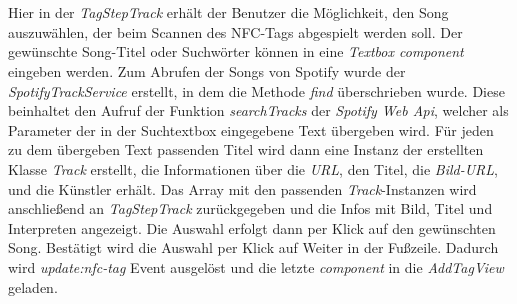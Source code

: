\documentclass[10pt, a4paper]{article}
\begin{document}
\begin{onehalfspace}
\\~\\
Hier in der \textit{TagStepTrack} erhält der Benutzer die Möglichkeit, den Song auszuwählen, der beim Scannen des NFC-Tags abgespielt werden soll.
Der gewünschte Song-Titel oder Suchwörter können in eine \textit{Textbox component} eingeben werden. Zum Abrufen der Songs von Spotify wurde der \textit{SpotifyTrackService} erstellt, in dem die Methode \textit{find} überschrieben wurde.
Diese beinhaltet den Aufruf der Funktion \textit{searchTracks} der \textit{Spotify Web Api}, welcher als Parameter der in der Suchtextbox eingegebene Text übergeben wird.
Für jeden zu dem übergeben Text passenden Titel wird dann eine Instanz der erstellten Klasse \textit{Track} erstellt, die Informationen über die \textit{URL}, den Titel, die \textit{Bild-URL}, und die Künstler erhält. Das Array mit den passenden \textit{Track}-Instanzen wird anschließend an \textit{TagStepTrack} zurückgegeben und die Infos mit Bild, Titel und Interpreten angezeigt. Die Auswahl erfolgt dann per Klick auf den gewünschten Song.
Bestätigt wird die Auswahl per Klick auf \glqq Weiter\grqq{} in der Fußzeile.
Dadurch wird \textit{update:nfc-tag} Event ausgelöst und die letzte \textit{component} in die \textit{AddTagView} geladen.
\\~\\

\end{onehalfspace}
\end{document}
